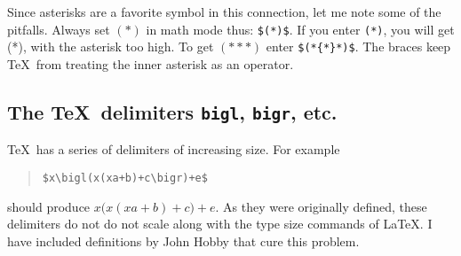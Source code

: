 Since asterisks are a favorite symbol in this connection, let me note
some of the pitfalls.  Always set $(*)$ in math mode thus:
\verb|$(*)$|.  If you enter \verb|(*)|, you will get (*), with the
asterisk too high.  To get $(*{*}*)$ enter \verb|$(*{*}*)$|.  The
braces keep \TeX\ from treating the inner asterisk as an operator.

\subsection{The \TeX\ delimiters {\tt bigl}, {\tt bigr}, etc.}
\TeX\ has a series of delimiters of increasing size.  For example
\begin{quote}
\begin{verbatim}
$x\bigl(x(xa+b)+c\bigr)+e$
\end{verbatim}
\end{quote}
should produce $x\bigl(x(xa+b)+c\bigr)+e$.  As they were originally
defined, these delimiters do not do not scale along with the type
size commands of \LaTeX.  I have included definitions by John Hobby
that cure this problem.

